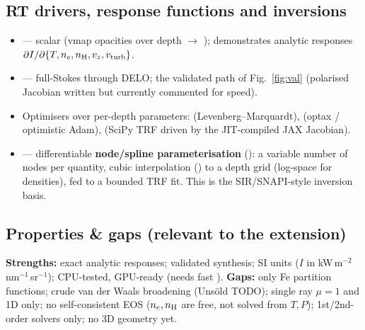 \subsection*{RT drivers, response functions and inversions}
\begin{itemize}
  \item {} --- scalar  (vmap opacities over depth $\to$ );
        demonstrates analytic responses $\partial I/\partial\{T,n_e,n_{\rm H},v_z,v_{\rm turb}\}$.
  \item {} --- full-Stokes  through DELO; the validated
        path of Fig.~\ref{fig:val} (polarised Jacobian written but currently commented for speed).
  \item Optimisers over per-depth parameters:  (Levenberg--Marquardt),
         (optax / optimistic Adam), 
        (SciPy  TRF driven by the JIT-compiled JAX Jacobian).
  \item {} --- differentiable \textbf{node/spline parameterisation} (): a variable
        number of nodes per quantity, cubic interpolation () to a depth grid (log-space for
        densities), fed to a bounded TRF fit. This is the SIR/SNAPI-style inversion basis.
\end{itemize}

\subsection*{Properties \& gaps (relevant to the extension)}
\textbf{Strengths:} exact analytic responses; validated synthesis; SI units
($I$ in kW\,m$^{-2}$\,nm$^{-1}$\,sr$^{-1}$); CPU-tested, GPU-ready (needs fast ).
\quad\textbf{Gaps:} only Fe partition functions; crude van der Waals broadening (Uns\"old TODO);
single ray $\mu\!=\!1$ and 1D only; no self-consistent EOS ($n_e,n_{\rm H}$ are free, not solved from $T,P$);
1st/2nd-order solvers only; no 3D geometry yet.


